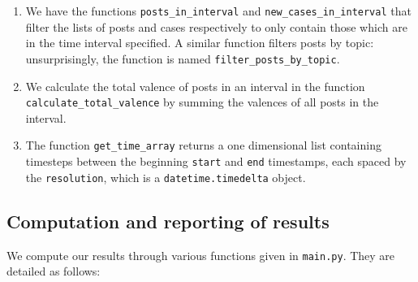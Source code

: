 \documentclass[fontsize=11pt]{article}
\begin{document}
\begin{enumerate}
    \item We have the functions \texttt{posts\_in\_interval} and \texttt{new\_cases\_in\_interval} that filter the lists of posts and cases respectively to only contain those which are in the time interval specified. A similar function filters posts by topic: unsurprisingly, the function is named \texttt{filter\_posts\_by\_topic}.
    
    \item We calculate the total valence of posts in an interval in the function \texttt{calculate\_total\_valence} by summing the valences of all posts in the interval.
    
    \item The function \texttt{get\_time\_array} returns a one dimensional list containing timesteps between the beginning \texttt{start} and \texttt{end} timestamps, each spaced by the \texttt{resolution}, which is a \texttt{datetime.timedelta} object.
\end{enumerate}

\subsection{Computation and reporting of results}

We compute our results through various functions given in \texttt{main.py}. They are detailed as follows:
\end{document}
